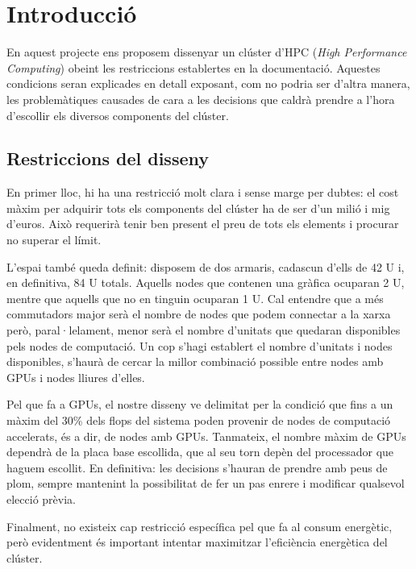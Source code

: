 \section{Introducció}\label{sec:intro}

En aquest projecte ens proposem dissenyar un clúster d'HPC (\textit{High Performance Computing}) obeint les restriccions establertes en la documentació. Aquestes condicions seran explicades en detall exposant, com no podria ser d'altra manera, les problemàtiques causades de cara a les decisions que caldrà prendre a l'hora d'escollir els diversos components del clúster.

\subsection{Restriccions del disseny}
En primer lloc, hi ha una restricció molt clara i sense marge per dubtes: el cost màxim per adquirir tots els components del clúster ha de ser d'un milió i mig d'euros. Això requerirà tenir ben present el preu de tots els elements i procurar no superar el límit.

L'espai també queda definit: disposem de dos armaris, cadascun d'ells de 42 U i, en definitiva, 84 U totals. Aquells nodes que contenen una gràfica ocuparan 2 U, mentre que aquells que no en tinguin ocuparan 1 U. Cal entendre que a més commutadors major serà el nombre de nodes que podem connectar a la xarxa però, paral·lelament, menor serà el nombre d'unitats que quedaran disponibles pels nodes de computació. Un cop s'hagi establert el nombre d'unitats i nodes disponibles, s'haurà de cercar la millor combinació possible entre nodes amb GPUs i nodes lliures d'elles.

Pel que fa a GPUs, el nostre disseny ve delimitat per la condició que fins a un màxim del 30\% dels flops del sistema poden provenir de nodes de computació accelerats, és a dir, de nodes amb GPUs. Tanmateix, el nombre màxim de GPUs dependrà de la placa base escollida, que al seu torn depèn del processador que haguem escollit. En definitiva: les decisions s'hauran de prendre amb peus de plom, sempre mantenint la possibilitat de fer un pas enrere i modificar qualsevol elecció prèvia.

Finalment, no existeix cap restricció específica pel que fa al consum energètic, però evidentment és important intentar maximitzar l'eficiència energètica del clúster. 


